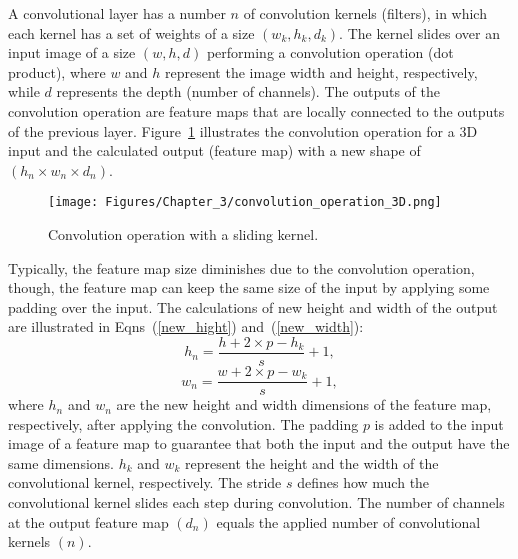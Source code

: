 A convolutional layer has a number \( n\) of convolution kernels (filters), in which each kernel has a set of weights of a size \((w_k,h_k,d_k)\).
The kernel slides over an input image of a size \((w,h,d)\) performing a convolution operation (dot product), where \(w\) and \(h\) represent the image width and height, respectively, while \(d\) represents the depth (number of channels).
The outputs of the convolution operation are feature maps that are locally connected to the outputs of the previous layer.
Figure~\ref{fig:convolution_3d} illustrates the convolution operation for a 3D input and the calculated output (feature map) with a new shape of \((h_{n}\times w_{n} \times d_{n})\).
\begin{figure} [!ht]
	\begin{center}
		\centering
		\texttt{[image: Figures/Chapter\_3/convolution\_operation\_3D.png]}
	\end{center}
	\caption{Convolution operation with a sliding kernel.} 
	\label{fig:convolution_3d}
\end{figure}

Typically, the feature map size diminishes due to the convolution operation, though, the feature map can keep the same size of the input by applying some padding over the input. 
The calculations of new height and width of the output are illustrated in Eqns~(\ref{new_hight}) and~(\ref{new_width}):
\begin{equation}
	h_{n} = \frac{h+2\times p-h_{k}}{s}+1,
	\label{new_hight}
\end{equation}
\begin{equation}
	w_{n} = \frac{w+2\times p-w_{k}}{s}+1,
	\label{new_width}
\end{equation} 
where \(h_{n}\) and \(w_{n}\) are the new height and width dimensions of the feature map, respectiv\-ely, after applying the convolution. 
The padding \(p\) is added to the input image of a feature map to guarantee that both the input and the output have the same dimensions.
\(h_{k}\) and \(w_{k}\) represent the height and the width of the convolutional kernel, respectively.
The stride \(s\) defines how much the convolutional kernel slides each step during convolu\-tion.
The number of channels at the output feature map \((d_{n})\) equals the applied number of convolutional kernels \((n)\).

